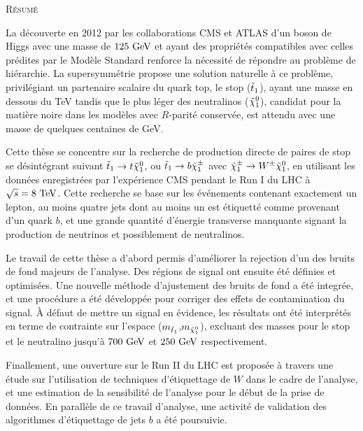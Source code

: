 \small{
\begin{framed}
    \vspace*{-0.7cm}
\begin{center}\textsc{Résumé}\end{center}
    \vspace*{-0.3cm}
    La découverte en 2012 par les collaborations CMS et ATLAS d'un boson de Higgs avec une
masse de $125~\text{GeV}$ et ayant des propriétés compatibles avec celles prédites par le
Modèle Standard renforce la nécessité de répondre au problème de hiérarchie. La
supersymmétrie propose une solution naturelle à ce problème, privilégiant un
partenaire scalaire du quark top, le stop ($\tilde{t}_1$), ayant une masse en dessous du
TeV tandis que le plus léger des neutralinos ($\tilde{\chi}_1^0$), candidat pour
la matière noire dans les modèles avec $R$-parité conservée, est attendu avec une masse
de quelques centaines de GeV.

    Cette thèse se concentre sur la recherche de production directe de paires de stop
se désintégrant suivant $\tilde{t}_1 \rightarrow t \tilde{\chi}_1^0$, ou $\tilde{t}_1 \rightarrow b
\tilde{\chi}_1^\pm$ avec $\tilde{\chi}_1^\pm \rightarrow W^\pm \tilde{\chi}_1^0$, en utilisant les données
enregistrées par l'expérience CMS pendant le Run I du LHC à $\sqrt{s} = 8~\text{TeV}$. Cette recherche
se base sur les événements contenant exactement un lepton, au moins quatre jets dont au moins
un est étiquetté comme provenant d'un quark $b$, et une grande quantité d'énergie transverse
manquante signant la production de neutrinos et possiblement de neutralinos.

    Le travail de cette thèse a d'abord permis d'améliorer la rejection d'un des bruits
de fond majeurs de l'analyse. Des régions de signal ont ensuite été définies et optimisées.
Une nouvelle méthode d'ajustement des bruits de fond a été integrée, et une procédure a été développée pour corriger des effets de contamination
du signal. À défaut de mettre un signal en évidence, les résultats ont été interprétés en
terme de contrainte sur l'espace ($m_{\tilde{t}_1}$,$m_{\tilde{\chi}_1^0}$), excluant des masses
pour le stop et le neutralino jusqu'à $700~\text{GeV}$ et $250~\text{GeV}$ respectivement.

    Finallement, une ouverture sur le Run II du LHC est proposée à travers une étude sur
l'utilisation de techniques d'étiquettage de $W$ dans le cadre de l'analyse, et une
estimation de la sensibilité de l'analyse pour le début de la prise de données. En parallèle
de ce travail d'analyse, une activité de validation des algorithmes d'étiquettage de jets $b$
a été poursuivie.


\end{framed}}
